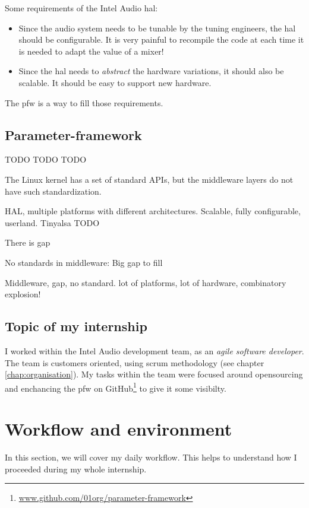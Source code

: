 Some requirements of the Intel Audio \gls{hal}:
\begin{itemize}
    \item Since the audio system needs to be tunable by the tuning engineers, the \gls{hal} should be configurable.
        It is very painful to recompile the code at each time it is needed to adapt the value of a mixer!
    \item Since the \gls{hal} needs to \emph{abstract} the hardware variations, it should also be scalable. It should be
        easy to support new hardware.
\end{itemize}

The \gls{pfw} is a way to fill those requirements.

\subsection{Parameter-framework}
\label{sec:parameter-framework}
TODO TODO TODO

The Linux \gls{kernel} has a set of standard APIs, but the middleware layers do not have such standardization.

HAL, multiple platforms with different architectures.
Scalable, fully configurable, userland.
Tinyalsa
TODO

There is gap

No standards in middleware:
Big gap to fill

Middleware, gap, no standard.
lot of platforms, lot of hardware, combinatory explosion!

\subsection{Topic of my internship}

I worked within the Intel Audio development team, as an \emph{agile
software developer}. The team is customers oriented, using \gls{scrum}
methodology (see chapter \ref{chap:organisation}). My tasks
within the team were focused around opensourcing and enchancing the \gls{pfw} on
\gls{GitHub}\footnote{\url{www.github.com/01org/parameter-framework}} to give it some
visibilty.


\section{Workflow and environment}
In this section, we will cover my daily workflow. This helps
to understand how I proceeded during my whole internship.


